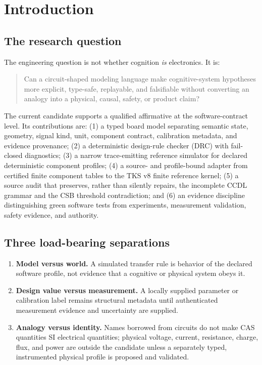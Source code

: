 \documentclass[11pt]{amsart}
\theoremstyle{definition}
\theoremstyle{remark}
\begin{document}
\section{Introduction}\label{sec:intro}

\subsection{The research question}
The engineering question is not whether cognition \emph{is} electronics. It is:

\begin{quote}
Can a circuit-shaped modeling language make cognitive-system hypotheses more explicit, type-safe, replayable, and falsifiable without converting an analogy into a physical, causal, safety, or product claim?
\end{quote}

The current candidate supports a qualified affirmative at the software-contract level. Its contributions are: (1) a typed board model separating semantic state, geometry, signal kind, unit, component contract, calibration metadata, and evidence provenance; (2) a deterministic design-rule checker (DRC) with fail-closed diagnostics; (3) a narrow trace-emitting reference simulator for declared deterministic component profiles; (4) a source- and profile-bound adapter from certified finite component tables to the TKS v8 finite reference kernel; (5) a source audit that preserves, rather than silently repairs, the incomplete CCDL grammar and the CSB threshold contradiction; and (6) an evidence discipline distinguishing green software tests from experiments, measurement validation, safety evidence, and authority.

\subsection{Three load-bearing separations}
\begin{enumerate}
\item \textbf{Model versus world.} A simulated transfer rule is behavior of the declared software profile, not evidence that a cognitive or physical system obeys it.
\item \textbf{Design value versus measurement.} A locally supplied parameter or calibration label remains structural metadata until authenticated measurement evidence and uncertainty are supplied.
\item \textbf{Analogy versus identity.} Names borrowed from circuits do not make CAS quantities SI electrical quantities; physical voltage, current, resistance, charge, flux, and power are outside the candidate unless a separately typed, instrumented physical profile is proposed and validated.
\end{enumerate}
\end{document}
